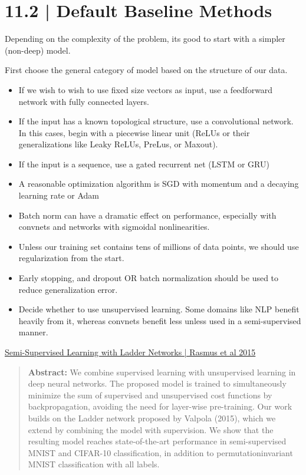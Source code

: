 \documentclass[letterpaper, 12pt]{report}
\begin{document}
\section{11.2 | Default Baseline Methods}

Depending on the complexity of the problem, its good to start with a simpler (non-deep) model. 

First choose the general category of model based on the structure of our data. 

\begin{itemize}
\item If we wish to wish to use fixed size vectors as input, use a feedforward network with fully connected layers.
\item If the input has a known topological structure, use a convolutional network. In this cases, begin with a piecewise linear unit (ReLUs or their generalizations like Leaky ReLUs, PreLus, or Maxout). 
\item If the input is a sequence, use a gated recurrent net (LSTM or GRU)
\item A reasonable optimization algorithm is SGD with momentum and a decaying learning rate or Adam 
\item Batch norm can have a dramatic effect on performance, especially with convnets and networks with sigmoidal nonlinearities. 
\item Unless our training set contains tens of millions of data points, we should use regularization from the start. 
\item Early stopping, and dropout OR batch normalization should be used to reduce generalization error. 
\item Decide whether to use unsupervised learning. Some domains like NLP benefit heavily from it, whereas convnets benefit less unless used in a semi-supervised manner.
\end{itemize}

\href{https://arxiv.org/pdf/1507.02672.pdf}{Semi-Supervised Learning with Ladder Networks | Rasmus et al 2015}

\begin{quote}
  \textbf{Abstract: } We combine supervised learning with unsupervised
  learning in deep neural networks. The proposed model is trained to
  simultaneously minimize the sum of supervised and unsupervised cost
  functions by backpropagation, avoiding the need for layer-wise
  pre-training. Our work builds on the Ladder network proposed by
  Valpola (2015), which we extend by combining the model with
  supervision. We show that the resulting model reaches
  state-of-the-art performance in semi-supervised MNIST and CIFAR-10
  classification, in addition to permutationinvariant MNIST
  classification with all labels.
\end{quote}
\end{document}
